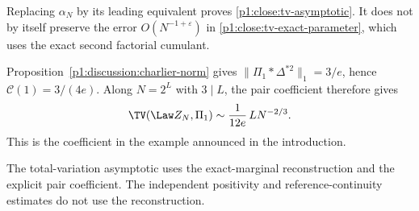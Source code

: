 Replacing $\alpha_N$ by its leading equivalent proves
\eqref{p1:close:tv-asymptotic}.  It does not by itself preserve
the error $O(N^{-1+\varepsilon})$ in
\eqref{p1:close:tv-exact-parameter}, which uses the exact
second factorial cumulant.

Proposition~\ref{p1:discussion:charlier-norm} gives
$\|\Pi_1*\Delta^{*2}\|_1=3/e$, hence $\mathcal C(1)=3/(4e)$.
Along $N=2^L$ with $3\mid L$, the pair coefficient therefore gives
\begin{equation}
 \TV(\Law Z_N,\Pi_1)
       \sim \frac1{12e}\,L N^{-2/3}.
 \label{p1:close:dyadic-example}
\end{equation}
This is the coefficient in the example announced in the introduction.

The total-variation asymptotic uses the exact-marginal reconstruction
and the explicit pair coefficient. The independent positivity and
reference-continuity estimates do not use the reconstruction.
